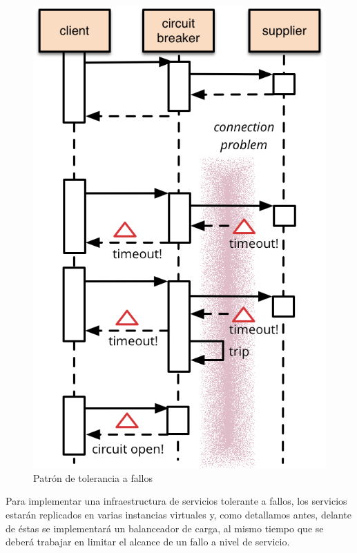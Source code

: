 \begin{figure}[H]
  \includegraphics[width=\linewidth]{src/images/04-capitulo-4/circuit_breaker.png}
  \caption{Patrón de tolerancia a fallos }
  \label{fig:circuit_breaker}
\end{figure}

Para implementar una infraestructura de servicios tolerante a fallos, los servicios estarán replicados en varias instancias virtuales y, como detallamos antes, delante de éstas se implementará un balanceador de carga, al mismo tiempo que se deberá trabajar en limitar el alcance de un fallo a nivel de servicio.


